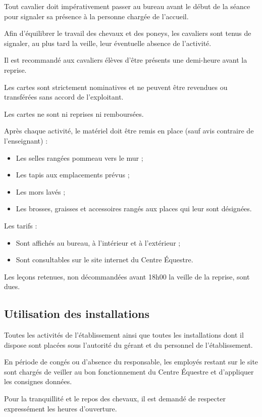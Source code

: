 \documentclass[11pt,a4paper]{article}
\begin{document}
Tout cavalier doit impérativement passer au bureau avant le début de la séance pour signaler sa présence à la personne chargée de l'accueil.

Afin d'équilibrer le travail des chevaux et des poneys, les cavaliers sont tenus de signaler, au plus tard la veille, leur éventuelle absence de l'activité.

Il est recommandé aux cavaliers élèves d'être présents une demi-heure avant la reprise.

Les cartes sont strictement nominatives et ne peuvent être revendues ou transférées sans accord de l'exploitant.

Les cartes ne sont ni reprises ni remboursées.

Après chaque activité, le matériel doit être remis en place (sauf avis contraire de l'enseignant) :
\begin{itemize}[leftmargin=50pt]
	\item
	Les selles rangées pommeau vers le mur ;
	\item
	Les tapis aux emplacements prévus ;
	\item
	Les mors lavés ;
	\item
	Les brosses, graisses et accessoires rangés aux places qui leur sont désignées.
\end{itemize}

Les tarifs :
\begin{itemize}[leftmargin=50pt]
\item
Sont affichés au bureau, à l'intérieur et à l'extérieur ;
\item
Sont consultables sur le site internet du Centre Équestre.
\end{itemize}

Les leçons retenues, non décommandées avant 18h00 la veille de la reprise, sont dues.

\subsection{Utilisation des installations}\label{subsec:utilisation-des-installations}
Toutes les activités de l'établissement ainsi que toutes les installations dont il dispose sont placées sous l'autorité du gérant et du personnel de l'établissement.

En période de congés ou d'absence du responsable, les employés restant sur le site sont chargés de veiller au bon fonctionnement du Centre Équestre et d'appliquer les consignes données.

Pour la tranquillité et le repos des chevaux, il est demandé de respecter expressément les heures d'ouverture.
\end{document}

